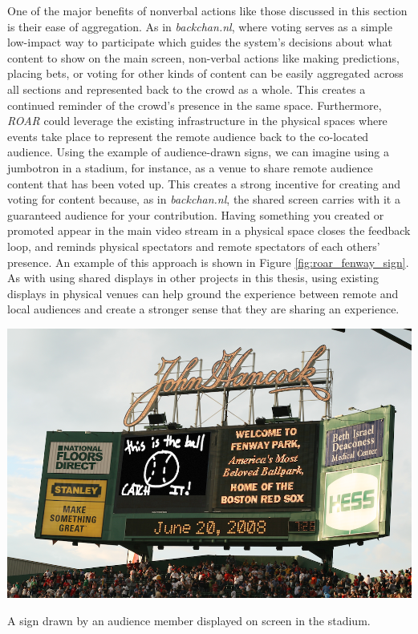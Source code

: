 One of the major benefits of nonverbal actions like those discussed in this section is their ease of aggregation. As in \emph{backchan.nl}, where voting serves as a simple low-impact way to participate which guides the system's decisions about what content to show on the main screen, non-verbal actions like making predictions, placing bets, or voting for other kinds of content can be easily aggregated across all sections and represented back to the crowd as a whole. This creates a continued reminder of the crowd's presence in the same space. Furthermore, \emph{ROAR} could leverage the existing infrastructure in the physical spaces where events take place to represent the remote audience back to the co-located audience. Using the example of audience-drawn signs, we can imagine using a jumbotron in a stadium, for instance, as a venue to share remote audience content that has been voted up. This creates a strong incentive for creating and voting for content because, as in \emph{backchan.nl}, the shared screen carries with it a guaranteed audience for your contribution. Having something you created or promoted appear in the main video stream in a physical space closes the feedback loop, and reminds physical spectators and remote spectators of each others' presence. An example of this approach is shown in Figure \ref{fig:roar_fenway_sign}. As with using shared displays in other projects in this thesis, using existing displays in physical venues can help ground the experience between remote and local audiences and create a stronger sense that they are sharing an experience.

\begin{marginfigure}
	\includegraphics{figures/roar/stadium_sign_small.png}
	\caption{A sign drawn by an audience member displayed on screen in the stadium.}
	\label{fig:roar_fenway_sign}
\end{marginfigure}



